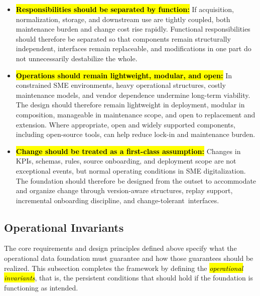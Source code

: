 \documentclass[systems,article,accept,pdftex,moreauthors]{Definitions/mdpi}
\begin{document}
\begin{itemize}
    \item[\textbf{\hl{P5.}}] \textbf{\hl{Responsibilities should be separated by function:}} If acquisition, normalization, storage, and downstream use are tightly coupled, both maintenance burden and change cost rise rapidly. Functional responsibilities should therefore be separated so that components remain structurally independent, interfaces remain replaceable, and modifications in one part do not unnecessarily destabilize the whole.

    \item[\textbf{\hl{P6.}}] \textbf{\hl{Operations should remain lightweight, modular, and open:}} In constrained SME environments, heavy operational structures, costly maintenance models, and vendor dependence undermine long-term viability. The design should therefore remain lightweight in deployment, modular in composition, manageable in maintenance scope, and open to replacement and extension. Where appropriate, open and widely supported components, including open-source tools, can help reduce lock-in and maintenance burden.
    
    \item[\textbf{\hl{P7.}}] \textbf{\hl{Change should be treated as a first-class assumption:}} Changes in KPIs, schemas, rules, source onboarding, and deployment scope are not exceptional events, but normal operating conditions in SME digitalization. The foundation should therefore be designed from the outset to accommodate and organize change through version-aware structures, replay support, incremental onboarding discipline, and \mbox{change-tolerant interfaces}.
\end{itemize}

\subsection{Operational Invariants}
\label{sec:operational_invariants}

The core requirements and design principles defined above specify what the operational data foundation must guarantee and how those guarantees should be realized. This subsection completes the framework by defining the \emph{\hl{operational invariants}}, that is, the persistent conditions that should hold if the foundation is functioning as intended.
\end{document}
